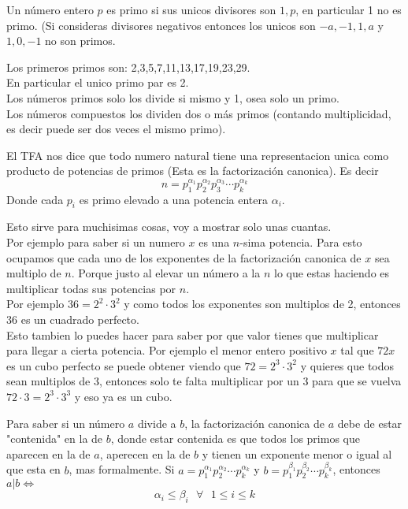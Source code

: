\documentclass[11pt]{scrartcl}
\begin{document}
\begin{definition} [Primo]
Un número entero $p$ es primo si sus unicos divisores son $1,p$, en particular 1 no es primo.  (Si consideras divisores negativos entonces los unicos son $-a,-1,1,a$ y $1,0,-1$ no son primos. 
\end{definition}
Los primeros primos son: 2,3,5,7,11,13,17,19,23,29. \\
En particular el unico primo par es 2.\\

Los números primos solo los divide si mismo y 1, osea solo un primo.\\
Los números compuestos los dividen dos o más primos (contando multiplicidad, es decir puede ser dos veces el mismo primo). 
\begin{theorem} 
El TFA nos dice que todo numero natural tiene una representacion unica como producto de potencias de primos (Esta es la factorización canonica). Es decir 
$$n= p_1^{\alpha_1}p_2^{\alpha_2}p_3^{\alpha_3}\cdots p_k^{\alpha_k}$$
Donde cada $p_i$ es primo elevado a una potencia entera $\alpha_i$. 
\end{theorem}

Esto sirve para muchisimas cosas, voy a mostrar solo unas cuantas.  \\

Por ejemplo para saber si un numero $x$ es una $n$-sima potencia. Para esto ocupamos que cada uno de los exponentes de la factorización canonica de $x$ sea multiplo de $n$. Porque justo al elevar un número a la $n$ lo que estas haciendo es multiplicar todas sus potencias por $n$.  \\
Por ejemplo $36=2^2\cdot 3^2$ y como todos los exponentes son multiplos de 2, entonces 36 es un cuadrado perfecto. \\
Esto tambien lo puedes hacer para saber por que valor tienes que multiplicar para llegar a cierta potencia. Por ejemplo el menor entero positivo $x$ tal que $72x$ es un cubo perfecto se puede obtener viendo que $72=2^3\cdot 3^2$ y quieres que todos sean multiplos de 3, entonces solo te falta multiplicar por un $3$ para que se vuelva $72\cdot 3 = 2^3\cdot 3^3$ y eso ya es un cubo. 



Para saber si un número $a$ divide a $b$, la factorización canonica de $a$ debe de estar "contenida" en la de $b$, donde estar contenida es que todos los primos que aparecen en la de $a$, aperecen en la de $b$ y tienen un exponente menor o igual al que esta en $b$, mas formalmente. 
Si $a=p_1^{\alpha_1}p_2^{\alpha_2}\cdots p_k^{\alpha_k}$ y $b=p_1^{\beta_1}p_2^{\beta_2}\cdots p_k^{\beta_k}$, entonces $a|b \Longleftrightarrow $
$$\alpha_i \leq \beta_i \text{  } \forall \text{  } 1\leq i\leq k$$
\end{document}
